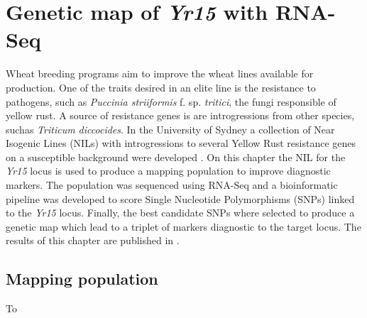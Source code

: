 
\chapter{Genetic map of \textit{Yr15} with RNA-Seq}
\label{yr15}
 
Wheat breeding programs aim to improve the wheat lines available for production. 
One of the traits desired in an elite line is the resistance to pathogens, such as \textit{Puccinia striiformis} f. sp.  \textit{tritici}, the fungi responsible of yellow rust.
A source of resistance genes is are introgressions from other species, suchas \textit{Triticum diccocides}. 
In the University of Sydney a collection of Near Isogenic Lines (NILs) with introgressions to several Yellow Rust resistance genes on a susceptible background were developed \citep{Wellings1998}. 
On this chapter the NIL for the \textit{Yr15} locus is used to produce a mapping population to improve diagnostic markers. 
The population was sequenced using RNA-Seq and a bioinformatic pipeline was developed to score Single Nucleotide Polymorphisms (SNPs) linked to the \textit{Yr15} locus.  
Finally, the best candidate SNPs where selected to produce a genetic map which lead to a triplet of markers diagnostic to the target locus. The results of this chapter are published in \citet{Ramirez-Gonzalez-2014}.

\section{Mapping population}
To   

